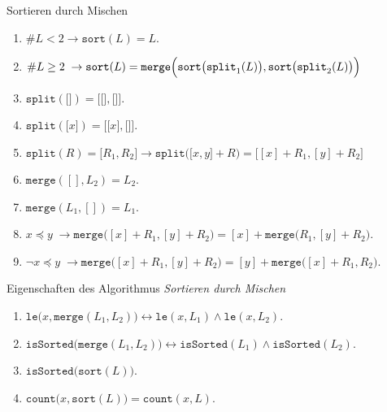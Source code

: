 \documentclass[12pt]{article}
\begin{document}
\begin{center}
{\Large Sortieren durch Mischen}
\end{center}

\begin{enumerate}
\item $\#L < 2 \rightarrow \mathtt{sort}(L) = L$.
\item $\#L \geq 2 \;\rightarrow \mathtt{sort}(L) = \mathtt{merge}\Bigl(\mathtt{sort}\bigl(\mathtt{split}_1(L)\bigr), \mathtt{sort}\bigl(\mathtt{split}_2(L)\bigr)\Bigr)$
\item $\mathtt{split}(\texttt{[]}) = \mathtt{[} \texttt{[]}, \texttt{[]} \mathtt{]}$.
\item $\mathtt{split}(\mathtt{[}x\mathtt{]}) = \mathtt{[} \texttt{[}x\texttt{]}, \texttt{[]} \mathtt{]}$.
\item $\mathtt{split}(R) = \mathtt{[}R_1, R_2\mathtt{]} \rightarrow
       \mathtt{split}\bigl(\mathtt{[}x, y\mathtt{]} + R\bigr) = \bigl[ [x] + R_1, [y] + R_2 \bigr]$
\item $\mathtt{merge}([], L_2) = L_2$.

\item $\mathtt{merge}(L_1, []) = L_1$.

\item $x \preceq y \;\rightarrow \mathtt{merge}\bigl([x]+R_1, [y]+R_2\bigr) = [x] + \mathtt{merge}\bigl(R_1,[y]+R_2\bigr)$.

\item $\neg x \preceq y \;\rightarrow \mathtt{merge}\bigl([x]+R_1, [y]+R_2\bigr) = [y] + \mathtt{merge}\bigl([x] + R_1,R_2\bigr)$.
\end{enumerate}
\vspace*{0.3cm}

\begin{center}
{\Large Eigenschaften des Algorithmus \emph{Sortieren durch Mischen}}
\end{center}

\begin{enumerate}
\item $\texttt{le}\bigl(x,\texttt{merge}(L_1,L_2)\bigr) \leftrightarrow \texttt{le}(x,L_1) \wedge \mathtt{le}(x,L_2)$.
\item $\texttt{isSorted}\bigl(\texttt{merge}(L_1,L_2)\bigr) \leftrightarrow \mathtt{isSorted}(L_1) \wedge \mathtt{isSorted}(L_2)$.
\item $\mathtt{isSorted}\bigl(\mathtt{sort}(L)\bigr)$.
\item $\mathtt{count}\bigl(x,\mathtt{sort}(L)\bigr) = \mathtt{count}(x,L)$.
\end{enumerate}
\end{document}
